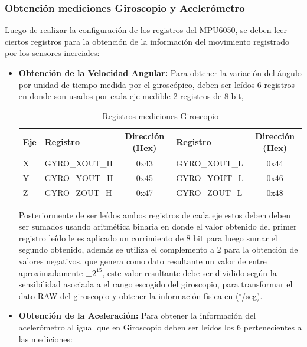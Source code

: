 \documentclass[12pt,a4paper]{article}
\newcommand{\grad}{$^{\circ}$}
\begin{document}
			\subsubsection{Obtención mediciones Giroscopio y Acelerómetro}
			Luego de realizar la configuración de los registros del MPU6050, se deben leer ciertos registros para la obtención de la información del movimiento registrado por los sensores inerciales:
			
			\begin{itemize}
				\item \textbf{Obtención de la Velocidad Angular:} Para obtener la variación del ángulo por unidad de tiempo medida por el giroscópico, deben ser leídos 6 registros en donde son usados por cada eje medible 2 registros de 8 bit,
				
				\begin{table}[H]
					\centering
					\label{table:registrosgyro}
					\begin{tabular}{|l|l|c|l|c|}
						\hline
						\textbf{Eje} & \textbf{Registro} & \textbf{Dirección (Hex)} & \textbf{Registro} & \textbf{Dirección (Hex)} \\ \hline
						X            & GYRO\_XOUT\_H     & 0x43                     & GYRO\_XOUT\_L     & 0x44                     \\ \hline
						Y            & GYRO\_YOUT\_H     & 0x45                     & GYRO\_YOUT\_L     & 0x46                     \\ \hline
						Z            & GYRO\_ZOUT\_H     & 0x47                     & GYRO\_ZOUT\_L     & 0x48                     \\ \hline
					\end{tabular}
					\caption{Registros mediciones Giroscopio}					
				\end{table}
				
				Posteriormente de ser leídos ambos registros de cada eje estos deben deben ser sumados usando aritmética binaria en donde el valor obtenido del primer registro leído le es aplicado un corrimiento de 8 bit para luego sumar el segundo obtenido, además se utiliza el complemento a 2 para la obtención de valores negativos, que genera como dato resultante un valor de entre aproximadamente $\pm 2^{15}$, este valor resultante debe ser dividido según la sensibilidad asociada a el rango escogido del giroscopio, para transformar el dato RAW del giroscopio y obtener la información física en (\grad/seg).
				
				\item \textbf{Obtención de la Aceleración:} Para obtener la información del acelerómetro al igual que en Giroscopio deben ser leídos los 6 pertenecientes a las mediciones:


\end{itemize}
\end{document}
